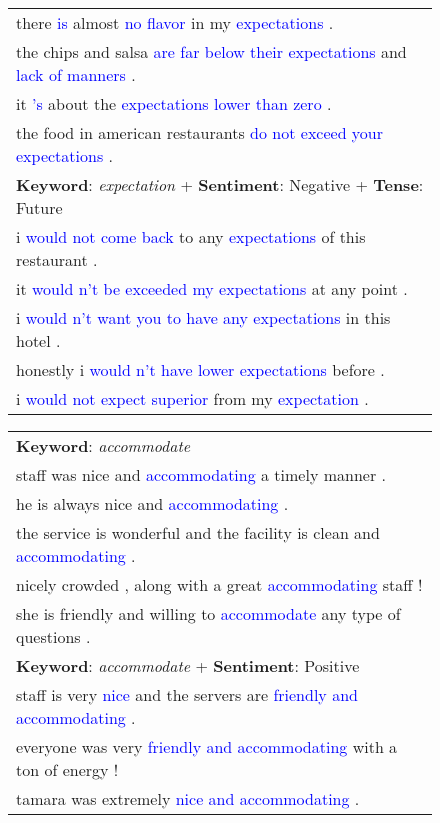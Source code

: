 \documentclass[11pt]{article}
\newcommand{\tenc}[1]{\textcolor{blue}{#1}}
\begin{document}
\begin{figure}[ht]
\begin{minipage}[ht]{.51\linewidth}
\begin{tabular}{l}
\\
there  \tenc{is} almost  \tenc{no flavor} in my  \tenc{expectations} .
\\
the chips and salsa  \tenc{are far below their expectations} and  \tenc{lack of manners} .
\\
it  \tenc{'s} about the  \tenc{expectations lower than zero} .
\\
the food in american restaurants  \tenc{do not exceed your expectations} .
\\\midrule
 \textbf{Keyword}: \textit{expectation} + \textbf{Sentiment}: Negative + \textbf{Tense}: Future\\
i  \tenc{would not come back} to any  \tenc{expectations} of this restaurant .
\\
it \tenc{would n't be exceeded my expectations} at any point .
\\
i \tenc{would n't want you to have any expectations} in this hotel .
\\
honestly i \tenc{would n't have lower expectations} before .
\\
i \tenc{would not expect superior} from my \tenc{expectation} .\\
\bottomrule
\end{tabular}
\end{minipage}
\hfill
\begin{minipage}[ht]{.47\linewidth}
\centering
\scriptsize
\begin{tabular}{|l}
\toprule
\textbf{Keyword}: \textit{accommodate}\\
    staff was nice and \tenc{accommodating} a timely manner .\\
    he is always nice and \tenc{accommodating} .\\
    the service is wonderful and the facility is clean and \tenc{accommodating} .\\
    nicely crowded , along with a great \tenc{accommodating} staff !\\
    she is friendly and willing to \tenc{accommodate} any type of questions .\\\midrule
\textbf{Keyword}: \textit{accommodate} + \textbf{Sentiment}: Positive\\
    staff is very \tenc{nice} and the servers are \tenc{friendly and accommodating} .\\
    everyone was very \tenc{friendly and accommodating} with a ton of energy !\\
    tamara was extremely \tenc{nice and accommodating} .\\

\end{tabular}
\end{minipage}
\end{figure}
\end{document}
